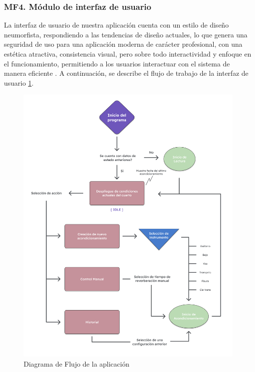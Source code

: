 \subsubsection{MF4. Módulo de interfaz de usuario}

La interfaz de usuario de nuestra aplicación cuenta con un estilo de diseño neumorfista, respondiendo a las tendencias de diseño actuales, lo que genera una seguridad de uso 
para una aplicación moderna de carácter profesional, con una estética atractiva, consistencia visual, pero sobre todo interactividad y enfoque en el funcionamiento, permitiendo 
a los usuarios interactuar con el sistema de manera eficiente \cite{neumorphism}. A continuación, se describe el flujo de trabajo de la interfaz de usuario \ref{fig:diagrama_flujo}. \\

\begin{figure}[!htb]
    \centering
    \includegraphics[width=1\linewidth]{imagenes/Diagrama de Flujo.png}
    \caption{Diagrama de Flujo de la aplicación}
    \label{fig:diagrama_flujo}
\end{figure}

